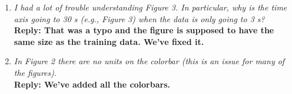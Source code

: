 \begin{enumerate}
\item \textsl{ I had a lot of trouble understanding Figure 3. In particular, why is the time axis going to 30 s (e.g., Figure 3) when the data is only going to 3 s?}\\

\textbf{Reply: That was a typo and the figure is supposed to have the same size as the training data. We've fixed it.}\\

\item \textsl{ In Figure 2 there are no units on the colorbar (this is an issue for many of the figures).
}\\

\textbf{Reply: We've added all the colorbars.}\\

\end{enumerate}

